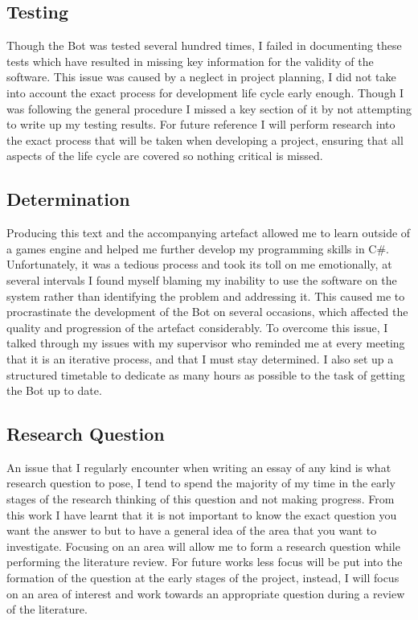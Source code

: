 \documentclass[journal]{IEEEtran}
\begin{document}
	\subsection{Testing}
    Though the Bot was tested several hundred times, I failed in documenting these tests which have resulted in missing key information for the validity of the software. This issue was caused by a neglect in project planning, I did not take into account the exact process for development life cycle early enough. Though I was following the general procedure I missed a key section of it by not attempting to write up my testing results. For future reference I will perform research into the exact process that will be taken when developing a project, ensuring that all aspects of the life cycle are covered so nothing critical is missed.
	
	\subsection{Determination}
	Producing this text and the accompanying artefact allowed me to learn outside of a games engine and helped me further develop my programming skills in C\#. Unfortunately, it was a tedious process and took its toll on me emotionally, at several intervals I found myself blaming my inability to use the software on the system rather than identifying the problem and addressing it. This caused me to procrastinate the development of the Bot on several occasions, which affected the quality and progression of the artefact considerably. To overcome this issue, I talked through my issues with my supervisor who reminded me at every meeting that it is an iterative process, and that I must stay determined. I also set up a structured timetable to dedicate as many hours as possible to the task of getting the Bot up to date.
	
	\subsection{Research Question}
	An issue that I regularly encounter when writing an essay of any kind is what research question to pose, I tend to spend the majority of my time in the early stages of the research thinking of this question and not making progress. From this work I have learnt that it is not important to know the exact question you want the answer to but to have a general idea of the area that you want to investigate. Focusing on an area will allow me to form a research question while performing the literature review. For future works less focus will be put into the formation of the question at the early stages of the project, instead, I will focus on an area of interest and work towards an appropriate question during a review of the literature.
	
\end{document}
